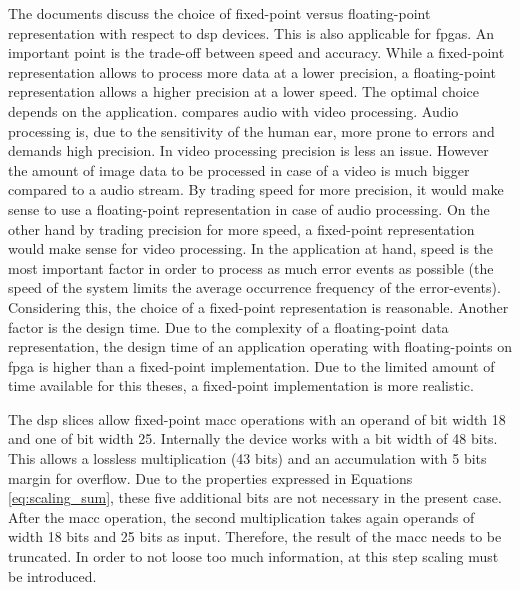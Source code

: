 \documentclass[mscthesis]{usiinfthesis}
\begin{document}
The documents \cite{smith97, ti04} discuss the choice of fixed-point versus
floating-point representation with respect to \gls{dsp} devices. This is also
applicable for \glspl{fpga}. An important point is the trade-off between speed
and accuracy. While a fixed-point representation allows to process more data at
a lower precision, a floating-point representation allows a higher precision at
a lower speed. The optimal choice depends on the application. \cite{ti04}
compares audio with video processing. Audio processing is, due to the
sensitivity of the human ear, more prone to errors and demands high precision.
In video processing precision is less an issue. However the amount of image
data to be processed in case of a video is much bigger compared to a audio
stream. By trading speed for more precision, it would make sense to use
a floating-point representation in case of audio processing. On the other hand
by trading precision for more speed, a fixed-point representation would make
sense for video processing. In the application at hand, speed is the most
important factor in order to process as much error events as possible (the
speed of the system limits the average occurrence frequency of the
error-events). Considering this, the choice of a fixed-point representation is
reasonable. Another factor is the design time. Due to the complexity of
a floating-point data representation, the design time of an application
operating with floating-points on \gls{fpga} is higher than a fixed-point
implementation. Due to the limited amount of time available for this theses,
a fixed-point implementation is more realistic.

The \gls{dsp} slices allow fixed-point \gls{macc} operations with an operand of
bit width 18 and one of bit width 25. Internally the device works with a bit
width of 48 bits. This allows a lossless multiplication (43 bits) and an
accumulation with 5 bits margin for overflow. Due to the properties expressed
in Equations \ref{eq:scaling_sum}, these five additional bits are not necessary
in the present case. After the \gls{macc} operation, the second multiplication
takes again operands of width 18 bits and 25 bits as input. Therefore, the
result of the \gls{macc} needs to be truncated. In order to not loose too much
information, at this step scaling must be introduced.
\end{document}
